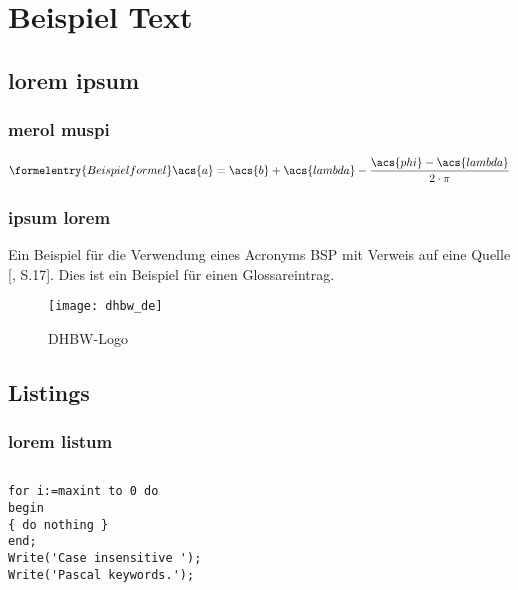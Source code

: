 
\chapter{Beispiel Text}
\section{lorem ipsum}
\subsection{merol muspi}
\begin{equation}\formelentry{Beispielformel}
\acs{a} = \acs{b} + \acs{lambda} - \frac{\acs{phi} - \acs{lambda}}{2 \cdot \pi}
\end{equation} 
\subsection{ipsum lorem}

Ein Beispiel für die Verwendung eines Acronyms \ac{BSP}
mit Verweis auf eine Quelle [\cite{Wollschlaeger2014}, S.17].
Dies ist ein Beispiel für einen \gls{Glossareintrag}.

\begin{figure}[!htbp]
    \centering
    \texttt{[image: dhbw\_de]}
    \caption{DHBW-Logo}
    \label{fig:dhbw_logo}
\end{figure}

\section{Listings}
\subsection{lorem listum}

\begin{lstlisting}[caption={Einbinden von Code aus externer Datei mit Angabe eines Zeilenbereichs},label=inputFromFile]

\end{lstlisting}


\begin{lstlisting}[caption=Dies ist ein Listing,label=lstcode]
for i:=maxint to 0 do
begin
{ do nothing }
end;
Write('Case insensitive ');
Write('Pascal keywords.');
\end{lstlisting}

